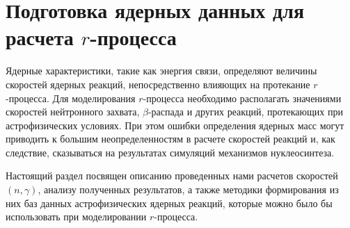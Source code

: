 \section{Подготовка ядерных данных для расчета $r$-процесса} 
Ядерные характеристики, такие как энергия связи, определяют величины скоростей ядерных реакций, непосредственно влияющих на протекание $r$-процесса. Для моделирования $r$-процесса необходимо располагать значениями скоростей нейтронного захвата, $\beta$-распада и других реакций, протекающих при астрофизических условиях. При этом ошибки определения ядерных масс могут приводить к большим неопределенностям в расчете скоростей реакций и, как следствие, сказываться на результатах симуляций механизмов нуклеосинтеза.

Настоящий раздел посвящен описанию проведенных нами расчетов скоростей $(n,\gamma)$, анализу полученных результатов, а также методики формирования из них баз данных астрофизических ядерных реакций, которые можно было бы использовать при моделировании $r$-процесса.




